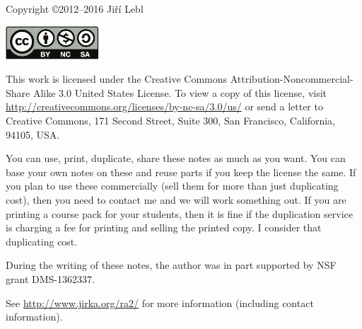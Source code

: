 \documentclass[12pt]{book}
\theoremstyle{plain}
\theoremstyle{remark}
\theoremstyle{definition}
\theoremstyle{exercise}
\theoremstyle{example}
\begin{document}
\bigskip

\noindent
Copyright \copyright 2012--2016 Ji{\v r}\'i Lebl

\bigskip

\noindent
\includegraphics[width=1.38in]{license}

\bigskip

\noindent
This work is licensed under the Creative Commons
Attribution-Non\-commercial-Share Alike 3.0 United States License. To view a
copy of this license, visit
\url{http://creativecommons.org/licenses/by-nc-sa/3.0/us/} or send a letter to
Creative Commons, 171 Second Street, Suite 300, San Francisco, California,
94105, USA.

\bigskip

\noindent
You can use, print, duplicate, share these notes as much as you want.  You can
base your own notes on these and reuse parts if you keep the license the
same.  If you plan to use these commercially (sell them for more than just
duplicating cost), then you need to contact me and we will work something out.
If you are printing a course pack for your students, then it is fine if the 
duplication service is charging a fee for printing and selling the printed
copy.  I consider that duplicating cost.

\bigskip

\noindent
During the writing of these notes, 
the author was in part supported by NSF grant DMS-1362337.

\bigskip

\noindent
See \url{http://www.jirka.org/ra2/} for more information
(including contact information).



\tableofcontents
{}

\newpage

\end{document}
